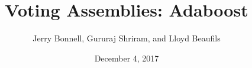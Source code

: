 \documentclass{beamer}
\title[Adaboost]{Voting Assemblies: Adaboost} %
\author{Jerry Bonnell, Gururaj Shriram, and Lloyd Beaufils} %
\institute[ML] {ECE548 Group 7}
\date{December 4, 2017} %
\begin{document}
{
\begin{frame}
\titlepage %
\end{frame}
}



\end{document}
